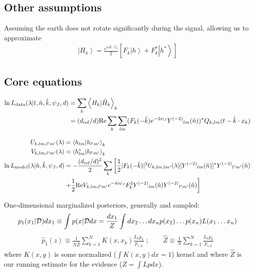 \documentclass[twocolumn,prd,nofootinbib]{revtex4}
\newcommand\Y[1]{Y^{(#1)}{}}
\newcommand\qmstate[1]{\left|#1\right \rangle}
\newcommand\qmstateproduct[2]{\left\langle#1|#2\right\rangle}
\begin{document}
\subsection{Other assumptions}
Assuming the earth does not rotate significantly during the signal, allowing us to approximate
\begin{eqnarray}
\qmstate{H_k} = \frac{e^{i\omega \hat{k}\cdot \vec{x}_k}}{2}\left[ 
   F_k  \qmstate{h} + F_k^* \qmstate{h^*} 
 \right]
\end{eqnarray}


\begin{widetext}
\subsection{Core equations}

\begin{align}
\ln L_{\rm data}(\lambda|t,\hat{n},\hat{k},\psi_J,d) &=  \sum_k\qmstateproduct{H_k}{\hat{H}_k}_k \nonumber \\
\label{eq:Implementation:lnLData}
&= (d_{\rm ref}/d) \text{Re} \sum_k \sum_{lm}(F_k(-\hat{k}) e^{-2\psi_J} \Y{-2}_{lm}(\hat{n}))^* Q_{k,lm}(t-\hat{k}\cdot x_k)
\end{align}

\begin{subequations}
\label{eq:ComputeRhoViaInnerProductMatrix}
\begin{align}
{ U_{k,lm,l'm'}(\lambda)}& = \qmstateproduct{h_{lm}}{h_{l'm'}}_k \\
V_{k,lm,l'm'}(\lambda)& = \qmstateproduct{h_{lm}^*}{h_{l'm'}}_k \\
\ln L_{\rm model}(\lambda|\hat{n},\hat{k},\psi_J,d) &=
   -\frac{(d_{\rm ref}/d)^2}{2}\sum_k
\left[
{
 \frac{1}{2}|F_k(-\hat{k})|^2 U_{k,lm,lm'}(\lambda)[\Y{-2}_{lm}(\hat{n})]^*\Y{-2}_{l'm'}(\hat{n})
}
 \right. \nonumber \\ & \left.
 {
+
 \frac{1}{2} \text{Re} V_{k,lm,l'm'} e^{-4i\psi_J}F_k^2 \Y{-2}_{lm}(\hat{n})\Y{-2}_{l'm'}(\hat{n})
}
\right]
\end{align}
\end{subequations}


One-dimensional marginalized posteriors, generally and sampled: 
\begin{eqnarray}
p_1(x_1|{\cal D}) dx_1 \equiv \int p(x|{\cal D} dx = \frac{dx_1}{Z} \int dx_{2}\ldots dx_n p(x_2)\ldots p(x_n)L(x_1\ldots x_n) 
\end{eqnarray}
\begin{eqnarray}
\hat{p}_1(z) \equiv \frac{1}{N \hat{Z}}\sum_{k=1}^N K(x,x_k) \frac{L_k p_k}{p_{s,k}} 
\; ; \qquad
\hat{Z} \equiv \frac{1}{N} \sum_{k=1}^N \frac{L_k p_k}{p_{s,k}}
\end{eqnarray}
where $K(x,y)$ is some normalized ($\int K(x,y) dx = 1$) kernel  and where $\hat{Z}$ is our running
estimate for the evidence ($Z = \int L p dx$).


\end{widetext}
\end{document}
